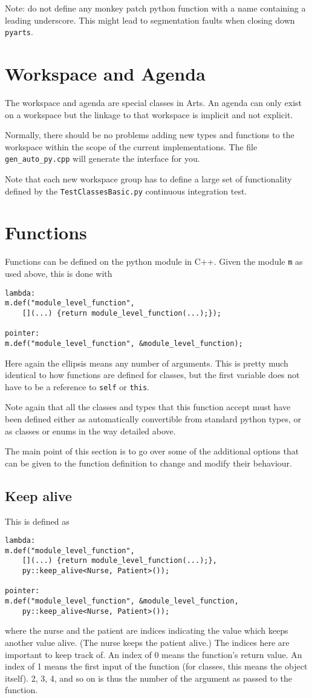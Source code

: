 Note: do not define any monkey patch python function with a name containing a leading underscore.  This might lead to
segmentation faults when closing down \verb|pyarts|.

\section{Workspace and Agenda}
The workspace and agenda are special classes in Arts.  An agenda can only exist on a workspace but the linkage to that workspace 
is implicit and not explicit.

Normally, there should be no problems adding new types and functions to the workspace within the scope of the current implementations.  The file \verb|gen_auto_py.cpp| will generate the interface for you.

Note that each new workspace group has to define a large set of functionality defined by the \verb|TestClassesBasic.py| continuous integration test.

\section{Functions}
Functions can be defined on the python module in C++.
Given the module \verb|m| as used above, this is done with
\begin{verbatim}
lambda:
m.def("module_level_function",
    [](...) {return module_level_function(...);});

pointer:
m.def("module_level_function", &module_level_function);
\end{verbatim}
Here again the ellipsis means any number of arguments.
This is pretty much identical to how functions are defined for classes, but the first variable does not have to be a reference to \verb|self| or \verb|this|.

Note again that all the classes and types that this function accept must have been defined either as automatically convertible from standard python types, or as classes or enums in the way detailed above.

The main point of this section is to go over some of the additional options that can be given to the function definition to change and modify their behaviour.

\subsection{Keep alive}
This is defined as
\begin{verbatim}
lambda:
m.def("module_level_function",
    [](...) {return module_level_function(...);},
    py::keep_alive<Nurse, Patient>());

pointer:
m.def("module_level_function", &module_level_function,
    py::keep_alive<Nurse, Patient>());
\end{verbatim}
where the nurse and the patient are indices indicating the value which keeps another value alive.  (The nurse keeps the patient alive.)
The indices here are important to keep track of.  An index of 0 means the function's return value.  An index of 1 means the first input of
the function (for classes, this means the object itself). 2, 3, 4, and so on is thus the number of the argument as passed to the function.

